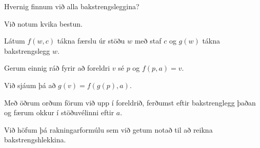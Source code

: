 {
    {
        \item<1-> Hvernig finnum við alla bakstrengsleggina?
        \item<2-> Við notum kvika bestun.
        \item<3-> Látum $f(w, c)$ tákna færslu úr stöðu $w$ með staf $c$ og $g(w)$ tákna bakstrengslegg $w$.
        \item<4-> Gerum einnig ráð fyrir að foreldri $v$ sé $p$ og $f(p, a) = v$.
        \item<5-> Við sjáum þá að $g(v) = f(g(p), a)$.
        \item<6-> Með öðrum orðum förum við upp í foreldrið, ferðumst eftir bakstrenglegg þaðan og færum okkur í stöðuvélinni eftir $a$.
        \item<7-> Við höfum þá rakningarformúlu sem við getum notað til að reikna bakstrengshlekkina.
    }
}


